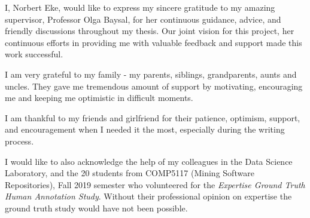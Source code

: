 I, Norbert Eke, would like to express my sincere gratitude to my amazing supervisor, Professor Olga Baysal, for her continuous guidance, advice, and friendly discussions throughout my thesis. Our joint vision for this project, her continuous efforts in providing me with valuable feedback and support made this work successful. 

I am very grateful to my family - my parents, siblings, grandparents, aunts and uncles. They gave me tremendous amount of support by motivating, encouraging me and keeping me optimistic in difficult moments.

I am thankful to my friends and girlfriend for their patience, optimism, support, and encouragement when I needed it the most, especially during the writing process. 

I would like to also acknowledge the help of my colleagues in the Data Science Laboratory, and the 20 students from COMP5117 (Mining Software Repositories), Fall 2019 semester who volunteered for the \emph{Expertise Ground Truth Human Annotation Study}. Without their professional opinion on expertise the ground truth study would have not been possible.  
